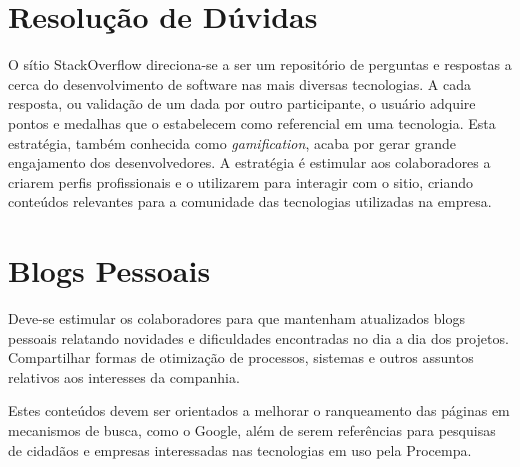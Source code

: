 \section{Resolução de Dúvidas}
O sítio StackOverflow direciona-se a ser um repositório de perguntas e respostas a cerca do desenvolvimento de software nas mais diversas tecnologias. A cada resposta, ou validação de um dada por outro participante, o usuário adquire pontos e medalhas que o estabelecem como referencial em uma tecnologia. Esta estratégia, também conhecida como \emph{gamification}, acaba por gerar grande engajamento dos desenvolvedores. A estratégia é estimular aos colaboradores a criarem perfis profissionais e o utilizarem para interagir com o sitio, criando conteúdos relevantes para a comunidade das tecnologias utilizadas na empresa.

\section{Blogs Pessoais}
Deve-se estimular os colaboradores para que mantenham atualizados blogs pessoais relatando novidades e dificuldades encontradas no dia a dia dos projetos. Compartilhar formas de otimização de processos, sistemas e outros assuntos relativos aos interesses da companhia.

Estes conteúdos devem ser orientados a melhorar o ranqueamento das páginas em mecanismos de busca, como o Google, além de serem referências para pesquisas de cidadãos e empresas interessadas nas tecnologias em uso pela Procempa.
